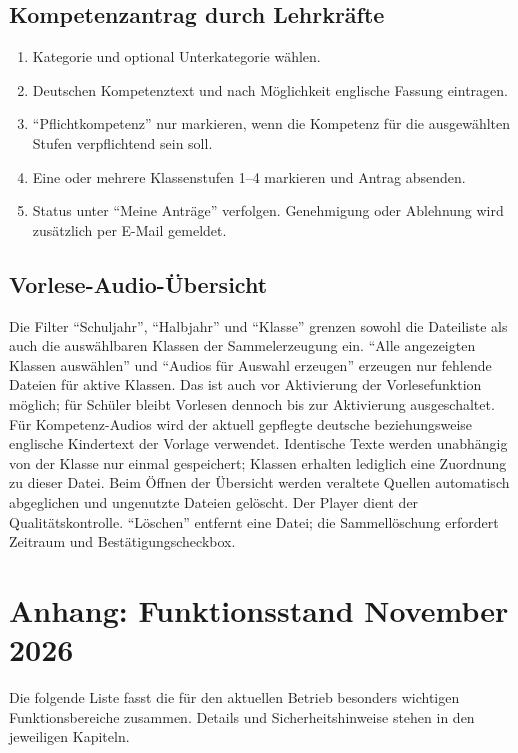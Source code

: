 \documentclass[12pt,a4paper]{article}
\begin{document}
\subsection{Kompetenzantrag durch Lehrkräfte}
\begin{enumerate}
  \item Kategorie und optional Unterkategorie wählen.
  \item Deutschen Kompetenztext und nach Möglichkeit englische Fassung eintragen.
  \item \enquote{Pflichtkompetenz} nur markieren, wenn die Kompetenz für die ausgewählten Stufen verpflichtend sein soll.
  \item Eine oder mehrere Klassenstufen 1--4 markieren und Antrag absenden.
  \item Status unter \enquote{Meine Anträge} verfolgen. Genehmigung oder Ablehnung wird zusätzlich per E-Mail gemeldet.
\end{enumerate}

\subsection{Vorlese-Audio-Übersicht}
Die Filter \enquote{Schuljahr}, \enquote{Halbjahr} und \enquote{Klasse} grenzen sowohl die Dateiliste als auch die auswählbaren Klassen der Sammelerzeugung ein. \enquote{Alle angezeigten Klassen auswählen} und \enquote{Audios für Auswahl erzeugen} erzeugen nur fehlende Dateien für aktive Klassen. Das ist auch vor Aktivierung der Vorlesefunktion möglich; für Schüler bleibt Vorlesen dennoch bis zur Aktivierung ausgeschaltet. Für Kompetenz-Audios wird der aktuell gepflegte deutsche beziehungsweise englische Kindertext der Vorlage verwendet. Identische Texte werden unabhängig von der Klasse nur einmal gespeichert; Klassen erhalten lediglich eine Zuordnung zu dieser Datei. Beim Öffnen der Übersicht werden veraltete Quellen automatisch abgeglichen und ungenutzte Dateien gelöscht. Der Player dient der Qualitätskontrolle. \enquote{Löschen} entfernt eine Datei; die Sammellöschung erfordert Zeitraum und Bestätigungscheckbox.

\section{Anhang: Funktionsstand November 2026}
Die folgende Liste fasst die für den aktuellen Betrieb besonders wichtigen Funktionsbereiche zusammen. Details und Sicherheitshinweise stehen in den jeweiligen Kapiteln.
\end{document}
